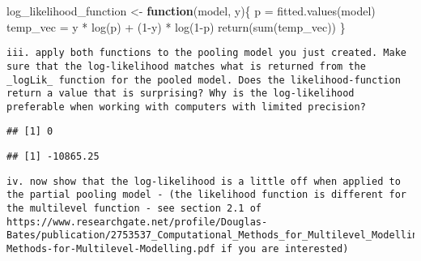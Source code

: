 \documentclass[
]{article}
\newenvironment{Shaded}{\begin{snugshade}}{\end{snugshade}}
\newcommand{\ControlFlowTok}[1]{\textcolor[rgb]{0.13,0.29,0.53}{\textbf{#1}}}
\newcommand{\DecValTok}[1]{\textcolor[rgb]{0.00,0.00,0.81}{#1}}
\newcommand{\FloatTok}[1]{\textcolor[rgb]{0.00,0.00,0.81}{#1}}
\newcommand{\FunctionTok}[1]{\textcolor[rgb]{0.00,0.00,0.00}{#1}}
\newcommand{\NormalTok}[1]{#1}
\newcommand{\OtherTok}[1]{\textcolor[rgb]{0.56,0.35,0.01}{#1}}
\newcommand{\SpecialCharTok}[1]{\textcolor[rgb]{0.00,0.00,0.00}{#1}}
\begin{document}
\begin{Shaded}
\begin{Highlighting}[]
\NormalTok{log\_likelihood\_function }\OtherTok{\textless{}{-}} \ControlFlowTok{function}\NormalTok{(model, y)\{}
\NormalTok{  p }\OtherTok{=} \FunctionTok{fitted.values}\NormalTok{(model)}
\NormalTok{  temp\_vec }\OtherTok{=}\NormalTok{ y }\SpecialCharTok{*} \FunctionTok{log}\NormalTok{(p) }\SpecialCharTok{+}\NormalTok{ (}\DecValTok{1}\SpecialCharTok{{-}}\NormalTok{y) }\SpecialCharTok{*} \FunctionTok{log}\NormalTok{(}\DecValTok{1}\SpecialCharTok{{-}}\NormalTok{p)}
  \FunctionTok{return}\NormalTok{(}\FunctionTok{sum}\NormalTok{(temp\_vec))}
\NormalTok{\}}
\end{Highlighting}
\end{Shaded}

\begin{verbatim}
iii. apply both functions to the pooling model you just created. Make sure that the log-likelihood matches what is returned from the _logLik_ function for the pooled model. Does the likelihood-function return a value that is surprising? Why is the log-likelihood preferable when working with computers with limited precision?  
\end{verbatim}

\begin{Shaded}
\end{Shaded}

\begin{verbatim}
## [1] 0
\end{verbatim}

\begin{Shaded}
\end{Shaded}

\begin{verbatim}
## [1] -10865.25
\end{verbatim}

\begin{verbatim}
iv. now show that the log-likelihood is a little off when applied to the partial pooling model - (the likelihood function is different for the multilevel function - see section 2.1 of https://www.researchgate.net/profile/Douglas-Bates/publication/2753537_Computational_Methods_for_Multilevel_Modelling/links/00b4953b4108d73427000000/Computational-Methods-for-Multilevel-Modelling.pdf if you are interested)  
\end{verbatim}
\end{document}
